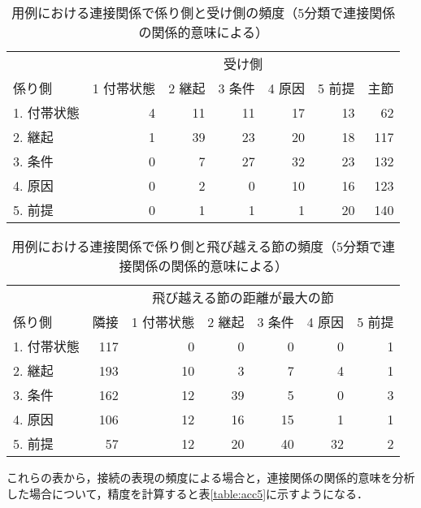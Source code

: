 \begin{table*}
\caption{用例における連接関係で係り側と受け側の頻度（5分類で連接関係の関係的意味による）}
\label{table:freq5sm}
\begin{tabular}{|l|r|r|r|r|r|r|}
\hline
\multicolumn{1}{|p{6zw}|}{} & \multicolumn{6}{|c|}{受け側}\\
\cline{2-7}
\multicolumn{1}{|p{6zw}|}{係り側} & \multicolumn{1}{|p{5zw}|}{1 付帯状態} & \multicolumn{1}{|p{4zw}|}{2 継起} & \multicolumn{1}{|p{4zw}|}{3 条件} & \multicolumn{1}{|p{4zw}|}{4 原因} & \multicolumn{1}{|p{4zw}|}{5 前提} & \multicolumn{1}{|p{4zw}|}{主節}\\
\hline
1. 付帯状態 & 4 & 11 & 11 & 17 & 13 & 62 \\
\cline{2-2}
2. 継起 & 1 & 39 & 23 & 20 & 18 & 117 \\
\cline{3-3}
3. 条件 & 0 & 7 & 27 & 32 & 23 & 132 \\
\cline{4-4}
4. 原因 & 0 & 2 & 0 & 10 & 16 & 123 \\
\cline{5-5}
5. 前提 & 0 & 1 & 1 & 1 & 20 & 140 \\
\hline
\end{tabular}
\end{table*}

\begin{table*}
\caption{用例における連接関係で係り側と飛び越える節の頻度（5分類で連接関係の関係的意味による）}
\label{table:freq5sj}
\begin{tabular}{|l|r|r|r|r|r|r|}
\hline
\multicolumn{1}{|p{6zw}|}{} & \multicolumn{6}{|c|}{飛び越える節の距離が最大の節}\\
\cline{2-7}
\multicolumn{1}{|p{6zw}|}{係り側} & \multicolumn{1}{|p{4zw}|}{隣接} & \multicolumn{1}{|p{5zw}|}{1 付帯状態} & \multicolumn{1}{|p{4zw}|}{2 継起} & \multicolumn{1}{|p{4zw}|}{3 条件} & \multicolumn{1}{|p{4zw}|}{4 原因} & \multicolumn{1}{|p{4zw}|}{5 前提} \\
\hline
1. 付帯状態 & 117 & 0 & 0 & 0 & 0 & 1 \\
\cline{3-3}
2. 継起 & 193 & 10 & 3 & 7 & 4 & 1 \\
\cline{4-4}
3. 条件 & 162 & 12 & 39 & 5 & 0 & 3 \\
\cline{5-5}
4. 原因 & 106 & 12 & 16 & 15 & 1 & 1 \\
\cline{6-6}
5. 前提 & 57 & 12 & 20 & 40 & 32 & 2 \\
\hline
\end{tabular}
\end{table*}

これらの表から，接続の表現の頻度による場合と，連接関係の関係的意味を分析した場合について，精度を計算すると表\ref{table:acc5}に示すようになる．

